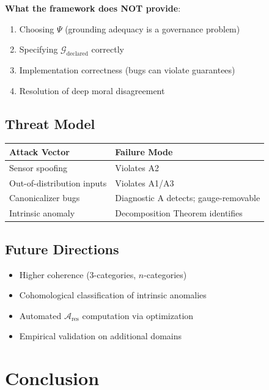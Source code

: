 \documentclass[12pt]{article}
\begin{document}
\textbf{What the framework does NOT provide}:
\begin{enumerate}
    \item Choosing $\Psi$ (grounding adequacy is a governance problem)
    \item Specifying $\mathcal{G}_{\mathrm{declared}}$ correctly
    \item Implementation correctness (bugs can violate guarantees)
    \item Resolution of deep moral disagreement
\end{enumerate}

\subsection{Threat Model}

\begin{table}[ht]
\centering
\begin{tabular}{@{}ll@{}}
\toprule
\textbf{Attack Vector} & \textbf{Failure Mode} \\
\midrule
Sensor spoofing & Violates A2 \\
Out-of-distribution inputs & Violates A1/A3 \\
Canonicalizer bugs & Diagnostic A detects; gauge-removable \\
Intrinsic anomaly & Decomposition Theorem identifies \\
\bottomrule
\end{tabular}
\end{table}

\subsection{Future Directions}
\begin{itemize}
    \item Higher coherence (3-categories, $n$-categories)
    \item Cohomological classification of intrinsic anomalies
    \item Automated $\mathcal{A}_{\mathrm{res}}$ computation via optimization
    \item Empirical validation on additional domains
\end{itemize}

\section{Conclusion}
\end{document}
